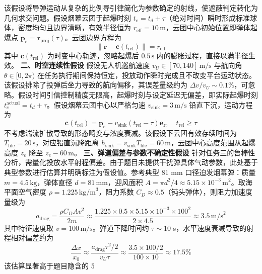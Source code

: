 \documentclass{JXUSTmodeling}
\begin{document}
该假设将导弹运动从复杂的比例导引律简化为参数确定的射线，使遮蔽判定转化为几何求交问题。假设烟幕云团于起爆时刻 $t_e=t_d+\tau$（绝对时间）瞬时形成标准球体，密度均匀且边界清晰，有效半径恒为 $r_{\text{eff}}=10\,\text{m}$，云团中心初始位置即弹体起爆点 $\mathbf{p}_e=\mathbf{r}_{\text{proj}}(\tau)$。云团边界方程为
\begin{equation}
\|\mathbf{r}-\mathbf{c}(t_{\text{rel}})\| = r_{\text{eff}} \tag{3}
\end{equation}
其中 $\mathbf{c}(t_{\text{rel}})$ 为时变中心轨迹，忽略起爆后 $0.5\,\text{s}$ 内的膨胀过程，直接以满半径生效。
\textbf{二、时空连续性假设}
假设无人机巡航速度 $v_U\in[70,140]\,\text{m/s}$ 与航向角 $\theta\in[0,2\pi)$ 在任务执行期间保持恒定，投放动作瞬时完成且不改变平台运动状态。该假设排除了投弹后坐力导致的航向偏移，其误差量级约为 $\Delta v/v_U \sim 0.1\%$，可忽略。假设时间引信控制精度无限高，起爆时刻与设定延迟无偏差，即实际起爆时刻 $t_e^{\text{actual}} = t_d + \tau$。假设烟幕云团中心以严格匀速 $v_{\text{sink}}=3\,\text{m/s}$ 铅直下沉，运动方程为
\begin{equation}
\mathbf{c}(t_{\text{rel}}) = \mathbf{p}_e - v_{\text{sink}}(t_{\text{rel}}-\tau)\mathbf{e}_z, \quad t_{\text{rel}} \geq \tau \tag{4}
\end{equation}
不考虑湍流扩散导致的形态畸变与浓度衰减。该假设下云团有效存续时间为 $T_{\text{life}}=20\,\text{s}$，对应铅直沉降距离 $h_{\text{sink}}=v_{\text{sink}}T_{\text{life}}=60\,\text{m}$，云团中心高度范围从起爆高度 $z_e$ 降至 $z_e-60\,\text{m}$。
\textbf{三、弹道偏差与参数不确定性假设}
针对任务三的鲁棒性分析，需量化投放水平射程偏差。由于题目未提供干扰弹具体气动参数，此处基于典型参数进行估算并明确标注为假设值。参考典型 81 mm 口径迫发烟幕弹：质量 $m=4.5\,\text{kg}$，弹体直径 $d=81\,\text{mm}$，迎风面积 $A=\pi d^2/4 \approx 5.15\times 10^{-3}\,\text{m}^2$。取海平面空气密度 $\rho=1.225\,\text{kg/m}^3$，阻力系数 $C_D\approx 0.5$（钝头弹体），则阻力加速度量级为
$$a_{\text{drag}} = \frac{\rho C_D A v^2}{2m} \approx \frac{1.225\times 0.5\times 5.15\times 10^{-3}\times 100^2}{2\times 4.5} \approx 3.5\,\text{m/s}^2$$
其中特征速度取 $v=100\,\text{m/s}$。弹道下降时间约 $\tau \sim 10$ s，水平速度衰减导致的射程相对偏差约为
$$\frac{\Delta x}{x_0} \approx \frac{a_{\text{drag}}\tau^2/2}{v_U\tau} \approx \frac{3.5\times 100/2}{100\times 10} \approx 17.5\%$$
该估算显著高于题目隐含的 5%
\end{document}
